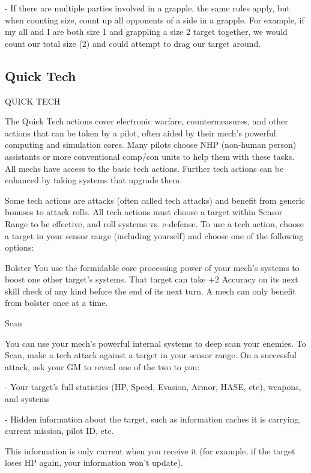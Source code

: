     -    If there are multiple parties involved in a grapple, the same rules apply, but when counting  
         size, count up all opponents of a side in a grapple. For example, if my all and I are both  
         size 1 and grappling a size 2 target together, we would count our total size (2) and could  
         attempt to drag our target around.   
\subsection{Quick Tech}

                                              QUICK TECH  

The Quick Tech actions cover electronic warfare, countermeasures, and other actions that can  
be taken by a pilot, often aided by their mech’s powerful computing and simulation cores. Many  
pilots choose NHP (non-human person) assistants or more conventional comp/con units to help  
them with these tasks. All mechs have access to the basic tech actions. Further tech actions can  
be enhanced by taking systems that upgrade them. 
 

Some tech actions are attacks (often called tech attacks) and benefit from generic bonuses to  
attack rolls. All tech actions must choose a target within Sensor Range to be effective, and roll  
systems vs. e-defense. To use a tech action, choose a target in your sensor range (including  
yourself) and choose one of the following options:
 

Bolster  
You use the formidable core processing power of your mech’s systems to boost one other  
target’s systems. That target can take +2 Accuracy on its next skill check of any kind before the  
end of its next turn. A mech can only benefit from bolster once at a time.
 

Scan
 
You can use your mech’s powerful internal systems to deep scan your enemies.  
To Scan, make a tech attack against a target in your sensor range. On a successful attack, ask  
your GM to reveal one of the two to you:
 
             -   Your target’s full statistics (HP, Speed, Evasion, Armor, HASE, etc), weapons, and  
                 systems
 
             -   Hidden information about the target, such as information caches it is carrying,  
                 current mission, pilot ID, etc. 
 
This information is only current when you receive it (for example, if the target loses HP again,  
your information won’t update).
 

